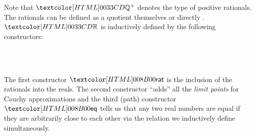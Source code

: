 Note that $\ratty^+$ denotes the type of positive rationals. The
rationals can be defined as a quotient themselves or directly
\cite{Altenkirch2011ii}. $\realty$ is inductively defined by the
following constructors:

\begin{datatype}{\realty}{}
  \constr{\realrat}{\ratty \to \realty} \\
   \\
\end{datatype}

The first constructor $\realrat$ is the inclusion of the rationals
into the reals. The second constructor ``adds'' all the \emph{limit
  points} for Cauchy approximations and the third (path) constructor
$\realeq$ tells us that any two real numbers are equal if they are
arbitrarily close to each other via the relation we inductively define
simultaneously.
%
\begin{datatype}{\realrel{\epsilon}{\_}{\_}}{}
   \\
   \\
   \\
\end{datatype}
